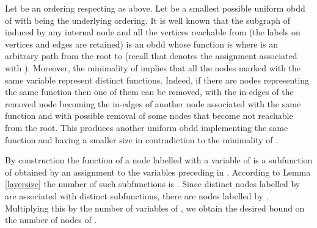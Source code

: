 \documentclass{article}
\begin{document}
Let  be an ordering respecting  as above. Let  be a smallest possible uniform {\sc obdd} of  
with  being the underlying ordering.  It is well known that the subgraph of  induced by any internal node 
and all the vertices reachable from  (the labels on vertices and edges are retained) is an {\sc obdd}
whose function is  where  is an arbitrary path from the root to  
(recall that  denotes the assignment associated with ). 
Moreover, the minimality of  implies that all the nodes marked with the same variable represent distinct functions.
Indeed, if there are  nodes representing the same function then one of them can be removed, with the
in-edges of the removed node becoming the in-edges of another node associated with the same function and with possible
removal of some nodes that become not reachable from the root. This produces another uniform {\sc obdd} implementing
the same function and having a smaller size in contradiction to the minimality of .

\begin{comment}
If for each variable  the number of nodes labeled by
 is at most  then we are done. Otherwise, let  be a variable such that there are
more than  nodes labeled with . Let  be the prefix of  including all
the variables occurring before . Assume that the prefix is nonempty. Then, as described
in the Preliminaries section, for each node  labeled with  there is an assignment  to 
such that the subgraph of  reachable from  is an {\sc obdd} realizing function . 
Since the number of nodes labeled with  is above  and the number of the respective functions
is at most  according to Lemma \ref{layersize}, there are two nodes  and  labeled with 
such that the subgraphs rooted by them realize the same function. It follows that  and  can be
contracted into a single node producing an {\sc obdd} smaller than  in contradiction to its minimality.
If  is the first variables then there is only one node labeled with , namely the root.

Since there are  variables, the number of nodes labeled with variables is at most  and 
thus (taking into account that the rest of nodes are just  leaves), the claimed upper bound holds.
\end{comment}

By construction the function of a node labelled with a variable  of  is a subfunction of
 obtained by an assignment to the variables preceding  in . According to Lemma \ref{layersize}
the number of such subfunctions is . Since distinct nodes labelled by  are associated
with distinct subfunctions, there are  nodes labelled by . Multiplying this by the number
 of variables of , we obtain the desired  bound on the number of nodes of . 
\end{document}
